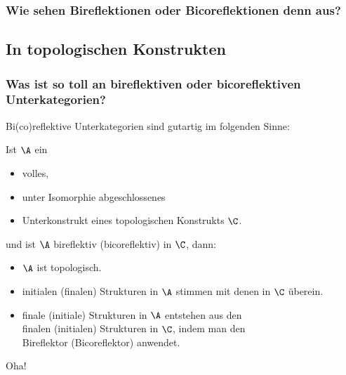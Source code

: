 \begin{frame}
\frametitle{Wie sehen Bireflektionen oder Bicoreflektionen denn aus?}
\end{frame}

\subsection{In topologischen Konstrukten}

\begin{frame}
  \frametitle{Was ist so toll an bireflektiven oder bicoreflektiven Unterkategorien?} 

\pause
  Bi(co)reflektive Unterkategorien sind gutartig im folgenden Sinne:
\pause

\begin{thm*}
  Ist $\A$ ein 
\begin{itemize}
\item volles,
\item unter Isomorphie abgeschlossenes
\item Unterkonstrukt eines topologischen Konstrukts $\C$.
\end{itemize}

\vspace{1em}
\pause
  und ist $\A$ bireflektiv (bicoreflektiv) in $\C$, dann:

\begin{itemize}
  \item<+-> $\A$ ist topologisch.
\item<+-> initialen (finalen) Strukturen in $\A$ stimmen mit denen in $\C$ überein.
\item<+-> finale (initiale) Strukturen in $\A$ entstehen aus den \\
finalen (initialen) Strukturen in $\C$, indem man den \\Bireflektor (Bicoreflektor) anwendet.
\end{itemize}
\end{thm*}

\pause
\vspace{1em}
\huge{Oha!}

\end{frame}

